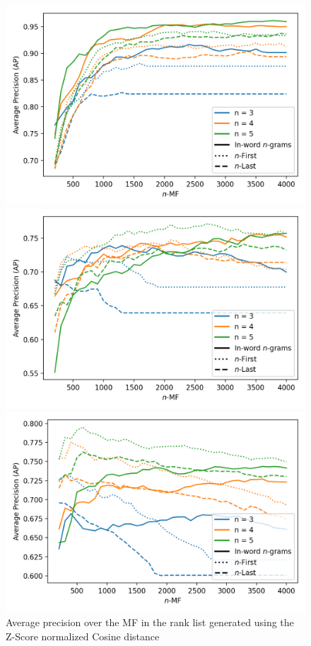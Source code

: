 \begin{figure}
  \centering
  \caption{Average precision over the MF in the rank list generated using the Z-Score normalized Cosine distance}
  \label{fig:first_last_letters_ngrams}

  \label{fig:first_last_letters_ngrams_oxquarry}
  \includegraphics[width=\linewidth]{img/first_last_letters_ngrams_oxquarry.png}

  \vspace{0.5cm}

  \label{fig:first_last_letters_ngrams_brunet}
  \includegraphics[width=\linewidth]{img/first_last_letters_ngrams_brunet.png}

  \vspace{0.5cm}

  \label{fig:first_last_letters_ngrams_st_jean}
  \includegraphics[width=\linewidth]{img/first_last_letters_ngrams_st_jean.png}
\end{figure}
